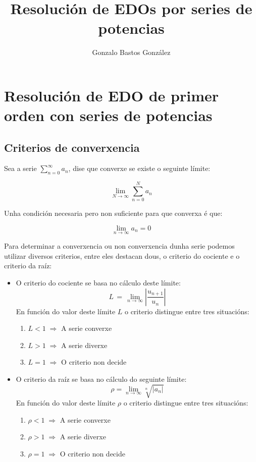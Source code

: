 \documentclass[a4paper,12pt,titlepage]{article}
\title{Resolución de EDOs por series de potencias}
\author{Gonzalo Bastos González}
\begin{document}
\section{Resolución de EDO de primer orden con series de potencias}

\subsection{Criterios de converxencia}

Sea a serie $\sum_{n=0}^\infty a_n$, dise que converxe se existe o seguinte límite:

\begin{equation*}
    \lim_{N \to \infty} \sum_{n=0}^N a_n
\end{equation*}

Unha condición necesaria pero non suficiente para que converxa é que:

\begin{equation*}
    \lim_{n\to \infty} a_n = 0
\end{equation*}

Para determinar a converxencia ou non converxencia dunha serie podemos utilizar diversos criterios, entre eles destacan dous, o criterio do cociente e o criterio da raíz:

\begin{itemize}
    \item O criterio do cociente se basa no cálculo deste límite:
    \begin{equation*}
        L\,=\,\operatorname*{lim}_{n\to\infty}\left|\frac{u_{n+1}}{u_{n}}\right|
    \end{equation*}
    En función do valor deste límite $L$ o criterio distingue entre tres situacións:
    \begin{enumerate}
        \item $L<1 \; \Rightarrow$ A serie converxe
        \item $L>1 \; \Rightarrow$ A serie diverxe
        \item $L=1 \; \Rightarrow$ O criterio non decide 
    \end{enumerate}
    \item O criterio da raíz se basa no cálculo do seguinte límite:
    \begin{equation*}
        \rho = \lim_{n\to\infty} \sqrt[n]{|a_n|}
    \end{equation*}
    En función do valor deste límite $\rho$ o criterio distingue entre tres situacións:
    \begin{enumerate}
        \item $\rho<1 \; \Rightarrow$ A serie converxe
        \item $\rho>1 \; \Rightarrow$ A serie diverxe
        \item $\rho=1 \; \Rightarrow$ O criterio non decide 
    \end{enumerate}
\end{itemize}
\end{document}
